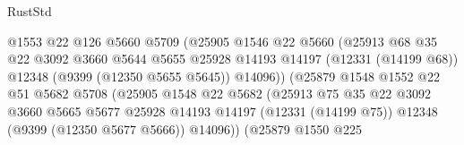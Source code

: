 \begin{lexlean}{RustStd}
\begin{coremodule}
                                      @1553
                                      @22
                                      @126
                                      @5660
                                      @5709
                                      (@25905
                                        @1546
                                        @22
                                        @5660
                                        (@25913
                                          @68
                                          @35
                                          @22
                                          @3092
                                          @3660
                                          @5644
                                          @5655
                                          @25928
                                          @14193
                                          @14197
                                          (@12331 (@14199 @68))
                                          @12348
                                          (@9399 (@12350 @5655 @5645))
                                          @14096))
                                      (@25879
                                        @1548
                                        @1552
                                        @22
                                        @51
                                        @5682
                                        @5708
                                        (@25905
                                          @1548
                                          @22
                                          @5682
                                          (@25913
                                            @75
                                            @35
                                            @22
                                            @3092
                                            @3660
                                            @5665
                                            @5677
                                            @25928
                                            @14193
                                            @14197
                                            (@12331 (@14199 @75))
                                            @12348
                                            (@9399 (@12350 @5677 @5666))
                                            @14096))
                                        (@25879
                                          @1550
                                          @225

\end{coremodule}
\end{lexlean}

